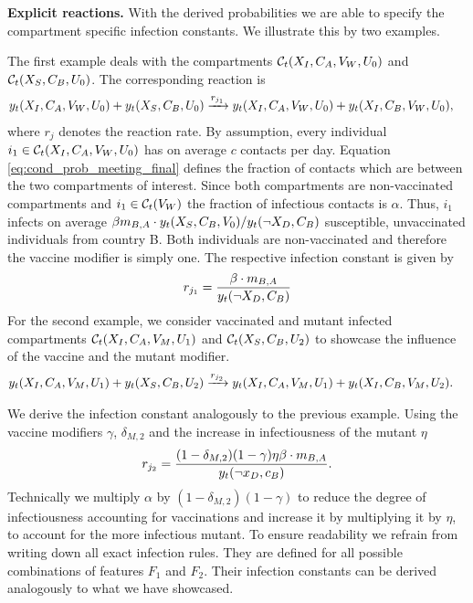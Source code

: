 \textbf{Explicit reactions.}
With the derived probabilities we are able to specify the compartment specific infection constants. We illustrate this by two examples. 

The first example deals with the compartments $\mathcal{C}_t(X_{I}, C_A, V_W, U_0)$ and $\mathcal{C}_t(X_{S}, C_B, U_0)$. The corresponding reaction is
\begin{align}
y_t(X_{I}, C_A, V_W, U_0) + y_t(X_{S}, C_B, U_0) &\xrightarrow{ r_{j_1}} y_t(X_{I}, C_A, V_W, U_0) + y_t(X_{I}, C_B, V_W, U_0),
\end{align}
where $r_j$ denotes the reaction rate.
By assumption, every individual $i_1 \in \mathcal{C}_t(X_{I}, C_A, V_W, U_0)$ has on average $c$ contacts per day. Equation \eqref{eq:cond_prob_meeting_final} defines the fraction of contacts which are between the two compartments of interest. Since both compartments are non-vaccinated compartments and $i_1 \in \mathcal{C}_t(V_W)$ the fraction of infectious contacts is $\alpha$. Thus, $i_1$ infects on average $\beta m_{B,A} \cdot y_t(X_S, C_B, V_0) / y_t(\neg X_D, C_B)$ susceptible, unvaccinated individuals from country B. Both individuals are non-vaccinated and therefore the vaccine modifier is simply one. The respective infection constant is given by
\begin{align}
r_{j_1} = \frac{\beta \cdot m_{B,A} }{ y_t(\neg X_D, C_B) } 
\end{align}
For the second example, we consider vaccinated and mutant infected compartments $\mathcal{C}_t(X_{I}, C_A, V_M, U_1)$ and $\mathcal{C}_t(X_{S}, C_B, U_2)$ to showcase the influence of the vaccine and the mutant modifier. 
\begin{align}
y_t(X_{I}, C_A, V_M, U_1) + y_t(X_{S}, C_B, U_2) &\xrightarrow{ r_{j_2}} y_t(X_{I}, C_A, V_M, U_1) + y_t(X_{I}, C_B, V_M, U_2).
\end{align}

We derive the infection constant analogously to the previous example. Using the vaccine modifiers $\gamma$, $\delta_{M, 2}$ and the increase in infectiousness of the mutant $\eta$ 
\begin{align}
r_{j_2} = \frac{(1-\delta_{M,2}) (1-\gamma) \eta \beta \cdot m_{B,A} }{ y_t(\neg x_D, c_B) }.
\end{align}
Technically we multiply $\alpha$ by $(1-\delta_{M,2}) (1-\gamma)$ to reduce the degree of infectiousness accounting for vaccinations and increase it by multiplying it by $\eta$, to account for the more infectious mutant. 
To ensure readability we refrain from writing down all exact infection rules. They are defined for all possible combinations of features $F_1$ and $F_2$. Their infection constants can be derived analogously to what we have showcased.

